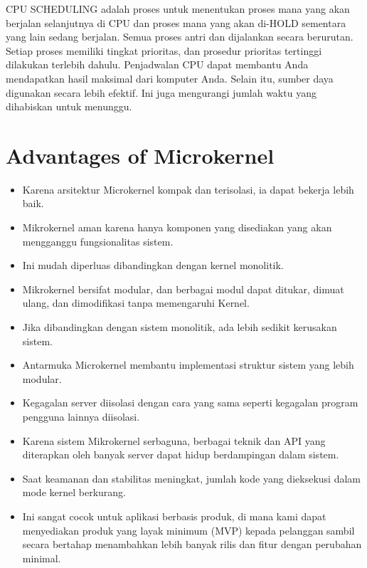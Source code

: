 \documentclass{report}
\begin{document}
	CPU SCHEDULING adalah proses untuk menentukan proses mana yang akan berjalan selanjutnya di CPU dan proses mana yang akan di-HOLD sementara yang lain sedang berjalan. Semua proses antri dan dijalankan secara berurutan. Setiap proses memiliki tingkat prioritas, dan prosedur prioritas tertinggi dilakukan terlebih dahulu. Penjadwalan CPU dapat membantu Anda mendapatkan hasil maksimal dari komputer Anda. Selain itu, sumber daya digunakan secara lebih efektif. Ini juga mengurangi jumlah waktu yang dihabiskan untuk menunggu.
	
	\section*{Advantages of Microkernel}
	
	\begin{itemize}
		\item Karena arsitektur Microkernel kompak dan terisolasi, ia dapat bekerja lebih baik.
		
		\item Mikrokernel aman karena hanya komponen yang disediakan yang akan mengganggu fungsionalitas sistem. 
		
		\item Ini mudah diperluas dibandingkan dengan kernel monolitik. 
		
		\item Mikrokernel bersifat modular, dan berbagai modul dapat ditukar, dimuat ulang, dan dimodifikasi tanpa memengaruhi Kernel.
		
		\item Jika dibandingkan dengan sistem monolitik, ada lebih sedikit kerusakan sistem.
		
		\item Antarmuka Microkernel membantu implementasi struktur sistem yang lebih modular.
		
		\item Kegagalan server diisolasi dengan cara yang sama seperti kegagalan program pengguna lainnya diisolasi.
		
		\item Karena sistem Mikrokernel serbaguna, berbagai teknik dan API yang diterapkan oleh banyak server dapat hidup berdampingan dalam sistem.
		
		\item Saat keamanan dan stabilitas meningkat, jumlah kode yang dieksekusi dalam mode kernel berkurang.
		
		\item Ini sangat cocok untuk aplikasi berbasis produk, di mana kami dapat menyediakan produk yang layak minimum (MVP) kepada pelanggan sambil secara bertahap menambahkan lebih banyak rilis dan fitur dengan perubahan minimal.
	\end{itemize}
	
\end{document}

